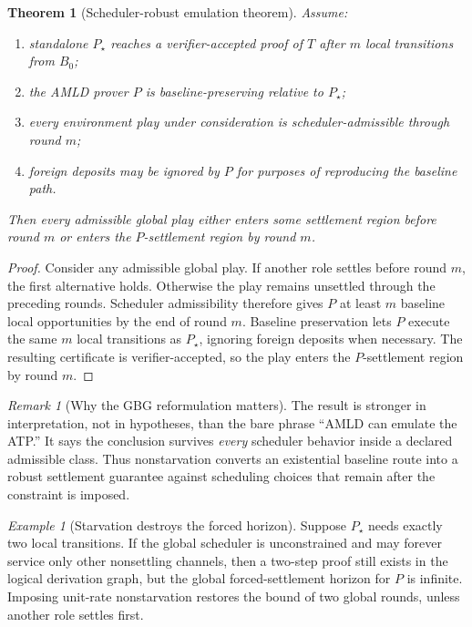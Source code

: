 \documentclass[11pt]{article}
\newtheorem{theorem}[definition]{Theorem}
\theoremstyle{remark}
\newtheorem{remark}[definition]{Remark}
\newtheorem{example}[definition]{Example}
\begin{document}
\begin{theorem}[Scheduler-robust emulation theorem]
Assume:
\begin{enumerate}[label=(\roman*),leftmargin=2.2em]
\item standalone $P_\star$ reaches a verifier-accepted proof of $T$ after $m$ local transitions from $B_0$;
\item the AMLD prover $P$ is baseline-preserving relative to $P_\star$;
\item every environment play under consideration is scheduler-admissible through round $m$;
\item foreign deposits may be ignored by $P$ for purposes of reproducing the baseline path.
\end{enumerate}
Then every admissible global play either enters some settlement region before round $m$ or enters the $P$-settlement region by round $m$.
\end{theorem}

\begin{proof}
Consider any admissible global play. If another role settles before round $m$, the first alternative holds. Otherwise the play remains unsettled through the preceding rounds. Scheduler admissibility therefore gives $P$ at least $m$ baseline local opportunities by the end of round $m$. Baseline preservation lets $P$ execute the same $m$ local transitions as $P_\star$, ignoring foreign deposits when necessary. The resulting certificate is verifier-accepted, so the play enters the $P$-settlement region by round $m$.
\end{proof}

\begin{remark}[Why the GBG reformulation matters]
The result is stronger in interpretation, not in hypotheses, than the bare phrase ``AMLD can emulate the ATP.'' It says the conclusion survives \emph{every} scheduler behavior inside a declared admissible class. Thus nonstarvation converts an existential baseline route into a robust settlement guarantee against scheduling choices that remain after the constraint is imposed.
\end{remark}

\begin{example}[Starvation destroys the forced horizon]
Suppose $P_\star$ needs exactly two local transitions. If the global scheduler is unconstrained and may forever service only other nonsettling channels, then a two-step proof still exists in the logical derivation graph, but the global forced-settlement horizon for $P$ is infinite. Imposing unit-rate nonstarvation restores the bound of two global rounds, unless another role settles first.
\end{example}
\end{document}
